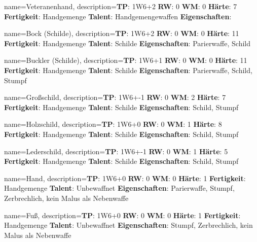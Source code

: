 {
    name={Veteranenhand},
    description={\textbf{TP}: 1W6+2 \textbf{RW}: 0 \textbf{WM}: 0 \textbf{Härte}: 7        \textbf{Fertigkeit}: Handgemenge \textbf{Talent}: Handgemengewaffen \textbf{{Eigenschaften}}: }
}



{
    name={Bock (Schilde)},
    description={\textbf{TP}: 1W6+2 \textbf{RW}: 0 \textbf{WM}: 0 \textbf{Härte}: 11        \textbf{Fertigkeit}: Handgemenge \textbf{Talent}: Schilde \textbf{{Eigenschaften}}: Parierwaffe, Schild}
}



{
    name={Buckler (Schilde)},
    description={\textbf{TP}: 1W6+1 \textbf{RW}: 0 \textbf{WM}: 0 \textbf{Härte}: 11        \textbf{Fertigkeit}: Handgemenge \textbf{Talent}: Schilde \textbf{{Eigenschaften}}: Parierwaffe, Schild, Stumpf}
}



{
    name={Großschild},
    description={\textbf{TP}: 1W6+-1 \textbf{RW}: 0 \textbf{WM}: 2 \textbf{Härte}: 7        \textbf{Fertigkeit}: Handgemenge \textbf{Talent}: Schilde \textbf{{Eigenschaften}}: Schild, Stumpf}
}



{
    name={Holzschild},
    description={\textbf{TP}: 1W6+0 \textbf{RW}: 0 \textbf{WM}: 1 \textbf{Härte}: 8        \textbf{Fertigkeit}: Handgemenge \textbf{Talent}: Schilde \textbf{{Eigenschaften}}: Schild, Stumpf}
}



{
    name={Lederschild},
    description={\textbf{TP}: 1W6+-1 \textbf{RW}: 0 \textbf{WM}: 1 \textbf{Härte}: 5        \textbf{Fertigkeit}: Handgemenge \textbf{Talent}: Schilde \textbf{{Eigenschaften}}: Schild, Stumpf}
}



{
    name={Hand},
    description={\textbf{TP}: 1W6+0 \textbf{RW}: 0 \textbf{WM}: 0 \textbf{Härte}: 1        \textbf{Fertigkeit}: Handgemenge \textbf{Talent}: Unbewaffnet \textbf{{Eigenschaften}}: Parierwaffe, Stumpf, Zerbrechlich, kein Malus als Nebenwaffe}
}



{
    name={Fuß},
    description={\textbf{TP}: 1W6+0 \textbf{RW}: 0 \textbf{WM}: 0 \textbf{Härte}: 1        \textbf{Fertigkeit}: Handgemenge \textbf{Talent}: Unbewaffnet \textbf{{Eigenschaften}}: Stumpf, Zerbrechlich, kein Malus als Nebenwaffe}
}



